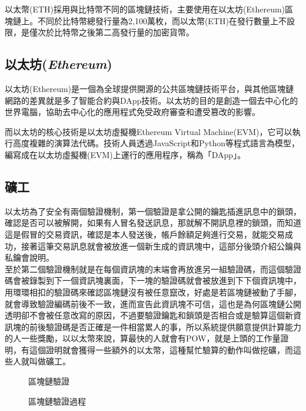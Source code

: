 以太幣(ETH)採用與比特幣不同的區塊鏈技術，主要使用在以太坊(Ethereum)區塊鏈上。不同於比特幣總發行量為2,100萬枚，而以太幣(ETH)在發行數量上不設限，是僅次於比特幣之後第二高發行量的加密貨幣。
\subsection{以太坊(\textsl{Ethereum})}
以太坊(Ethereum)是一個為全球提供開源的公共區塊鏈技術平台，與其他區塊鏈網路的差異就是多了智能合約與DApp技術。以太坊的目的是創造一個去中心化的世界電腦，協助去中心化的應用程式免受政府審查和遭受篡改的影響。 

而以太坊的核心技術是以太坊虛擬機Ethereum Virtual Machine(EVM)，它可以執行高度複雜的演算法代碼。技術人員透過JavaScript和Python等程式語言為模型，編寫成在以太坊虛擬機(EVM)上運行的應用程序，稱為「DApp」。
\subsection{礦工}
以太坊為了安全有兩個驗證機制，第一個驗證是拿公開的鑰匙插進訊息中的鎖頭，確認是否可以被解開，如果有人冒名發送訊息，那就解不開訊息裡的鎖頭，而知道這是假冒的交易資訊，確認是本人發送後，帳戶餘額足夠進行交易，就能交易成功，接著這筆交易訊息就會被放進一個新生成的資訊塊中，這部分後頭介紹公鑰與私鑰會說明。\\
至於第二個驗證機制就是在每個資訊塊的末端會再放進另一組驗證碼，而這個驗證碼會被錄製到下一個資訊塊裏面，下一塊的驗證碼就會被放進到下下個資訊塊中，用環環相扣的驗證碼來確認區塊鏈沒有被任意竄改，好處是若區塊鏈被動了手腳，就會導致驗證編碼前後不一致，進而宣告此資訊塊不可信，這也是為何區塊鏈公開透明卻不會被任意改寫的原因，不過要驗證鑰匙和鎖頭是否相合或是驗算這個新資訊塊的前後驗證碼是否正確是一件相當累人的事，所以系統提供願意提供計算能力的人一些獎勵，以以太幣來說，算最快的人就會有POW，就是上頭的工作量證明，有這個證明就會獲得一些額外的以太幣，這種幫忙驗算的動作叫做挖礦，而這些人就叫做礦工。

\begin{figure}[h]
    \caption{區塊鏈驗證}
    \label{fig:區塊鏈驗證}
\end{figure}
\begin{figure}[h]
    \caption{區塊鏈驗證過程}
    \label{fig:區塊鏈驗證過程}
\end{figure}
